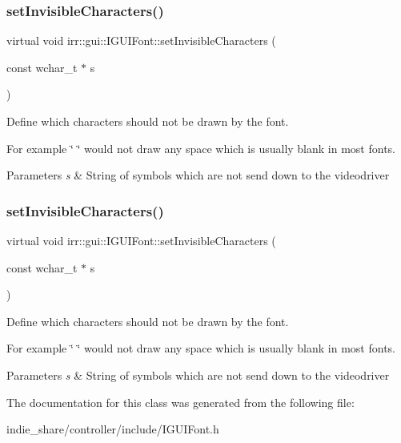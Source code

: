 \subsubsection{\texorpdfstring{set\+Invisible\+Characters()}{setInvisibleCharacters()}\hspace{0.1cm}{\footnotesize\ttfamily [1/2]}}
{\footnotesize\ttfamily virtual void irr\+::gui\+::\+I\+G\+U\+I\+Font\+::set\+Invisible\+Characters (\begin{DoxyParamCaption}\item[{const wchar\+\_\+t $\ast$}]{s }\end{DoxyParamCaption})\hspace{0.3cm}{\ttfamily [pure virtual]}}



Define which characters should not be drawn by the font. 

For example \char`\"{} \char`\"{} would not draw any space which is usually blank in most fonts. 
\begin{DoxyParams}{Parameters}
{\em s} & String of symbols which are not send down to the videodriver \\
\hline
\end{DoxyParams}
\mbox{\label{classirr_1_1gui_1_1IGUIFont_acff05412dc954845add611c5f71cef49}} 
\subsubsection{\texorpdfstring{set\+Invisible\+Characters()}{setInvisibleCharacters()}\hspace{0.1cm}{\footnotesize\ttfamily [2/2]}}
{\footnotesize\ttfamily virtual void irr\+::gui\+::\+I\+G\+U\+I\+Font\+::set\+Invisible\+Characters (\begin{DoxyParamCaption}\item[{const wchar\+\_\+t $\ast$}]{s }\end{DoxyParamCaption})\hspace{0.3cm}{\ttfamily [pure virtual]}}



Define which characters should not be drawn by the font. 

For example \char`\"{} \char`\"{} would not draw any space which is usually blank in most fonts. 
\begin{DoxyParams}{Parameters}
{\em s} & String of symbols which are not send down to the videodriver \\
\hline
\end{DoxyParams}


The documentation for this class was generated from the following file\+:\begin{DoxyCompactItemize}
\item 
indie\+\_\+share/controller/include/I\+G\+U\+I\+Font.\+h\end{DoxyCompactItemize}
